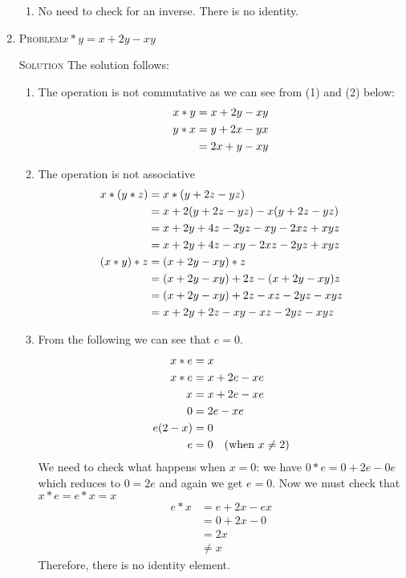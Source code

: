 \documentclass[draft,twoside]{amsart}
\newcommand{\Solution}{\textsc{Solution}\xspace}
\newcommand{\Problem}{\textsc{Problem}\xspace}
\begin{document}
\begin{enumerate}
\begin{enumerate}
      \item No need to check for an inverse. There is no identity.
   \end{enumerate}

   \item \Problem $x * y = x + 2y - xy$

   \noindent \Solution The solution follows:

   \begin{enumerate}
      
      \item The operation is not commutative as we can see from
            (1) and (2) below:
      \begin{align*}
         x * y & = x + 2y - xy \\
	 y * x & = y + 2x - yx \\
	       & = 2x + y - xy \notag
      \end{align*}


      \item The operation is not associative
      \begin{align*}
         x * (y * z) & = x * (y + 2z - yz)                          \\
	             & = x + 2(y + 2z - yz) - x(y + 2z - yz) \notag \\
		     & = x + 2y + 4z - 2yz - xy - 2xz + xyz  \notag \\
		     & = x + 2y + 4z - xy - 2xz - 2yz + xyz  \notag \\
	 (x * y) * z & = (x + 2y - xy) * z                          \\
	             & = (x + 2y - xy) + 2z - (x + 2y - xy)z \notag \\
		     & = (x + 2y - xy) + 2z - xz - 2yz - xyz \notag \\
		     & = x + 2y + 2z - xy - xz - 2yz - xyz   \notag
      \end{align*}

      \item From the following we can see that $e=0$. 
      \begin{align*}
         x * e & = x                  \\
	 x * e & = x + 2e - xe        \\
	     x & = x + 2e - xe \notag \\
	     0 & =     2e - xe \notag \\
	e(2-x) & = 0           \notag \\
	     e & = 0 \quad\text{(when $x \ne 2$)} \notag 
      \end{align*}
      We need to check what happens when $x = 0$: we have 
      $0*e=0+2e-0e$ which reduces to $0 = 2e$ and again we get $e = 0$.
      Now we must check that $x*e=e*x=x$
      \begin{align*}
         e * x & = e + 2x - ex      \\
	       & = 0 + 2x - 0       \\
	       & = 2x               \\
	       & \ne x              
      \end{align*}
      Therefore, there is no identity element.


\end{enumerate}
\end{enumerate}
\end{document}
